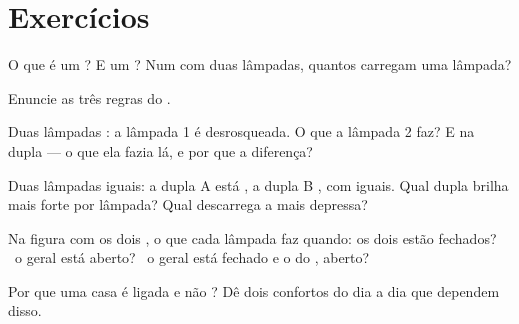 \section{Exercícios}

\begin{exercise}[$\star$]\label{exo:g5:series-parallel-circuits:1}
O que é um ? E um ? Num  com duas lâmpadas,
quantos  carregam uma lâmpada?
\end{exercise}

\begin{exercise}[$\star$]\label{exo:g5:series-parallel-circuits:2}
Enuncie as três regras do .
\end{exercise}

\begin{exercise}[$\star$]\label{exo:g5:series-parallel-circuits:3}
Duas lâmpadas : a lâmpada 1 é desrosqueada. O que a
lâmpada 2 faz? E na dupla  --- o que ela fazia lá, e por que
a diferença?
\end{exercise}

\begin{exercise}[$\star$]\label{exo:g5:series-parallel-circuits:4}
Duas lâmpadas iguais: a dupla A está , a dupla B ,
com  iguais. Qual dupla brilha mais forte por lâmpada? Qual
descarrega a  mais depressa?
\end{exercise}

\begin{exercise}[$\star$]\label{exo:g5:series-parallel-circuits:5}
Na figura com os dois , o que cada lâmpada faz quando:
os dois  estão fechados? \ o geral está aberto? \ o
geral está fechado e o do , aberto?
\end{exercise}

\begin{exercise}[$\star$]\label{exo:g5:series-parallel-circuits:6}
Por que uma casa é ligada  e não ? Dê dois
confortos do dia a dia que dependem disso.
\end{exercise}

